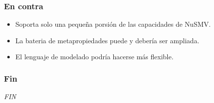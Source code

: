 \documentclass[serif]{beamer}
\begin{document}
\begin{frame}
\frametitle{En contra}
\begin{itemize}

\item Soporta solo una pequeña porsión de las capacidades de NuSMV.

\item La bateria de metapropiedades puede y debería ser ampliada.

\item El lenguaje de modelado podría hacerse más flexible.

\end{itemize}
\end{frame}



\begin{frame}
\frametitle{Fin}
\begin{center}{\LARGE \emph{FIN}}\end{center}
\end{frame}


\end{document}
